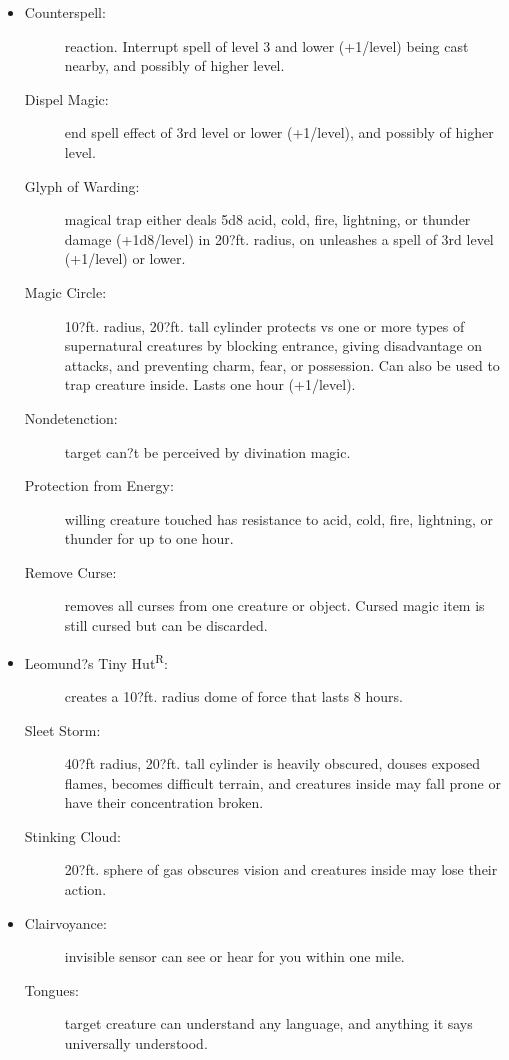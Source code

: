 \documentclass[DIV=14, paper=a4, fontsize=10pt, twocolumn, twoside]{scrartcl}
\begin{document}
\begin{itemize}[align=parleft,labelwidth=1cm]
	\renewcommand{\labelitemi}{Abjur}\item
	\begin{description}
 \item[Counterspell:] reaction. Interrupt spell of level 3 and lower (+1/level) being cast nearby, and possibly of higher level.
 \item[Dispel Magic:] end spell effect of 3rd level or lower (+1/level), and possibly of higher level.
 \item[Glyph of Warding:] magical trap either deals 5d8 acid, cold, fire, lightning, or thunder damage (+1d8/level) in 20?ft. radius, on unleashes a spell of 3rd level (+1/level) or lower.
 \item[Magic Circle:] 10?ft. radius, 20?ft. tall cylinder protects vs one or more types of supernatural creatures by blocking entrance, giving disadvantage on attacks, and preventing charm, fear, or possession. Can also be used to trap creature inside. Lasts one hour (+1/level).
 \item[Nondetenction:] target can?t be perceived by divination magic.
 \item[Protection from Energy:] willing creature touched has resistance to acid, cold, fire, lightning, or thunder for up to one hour.
 \item[Remove Curse:] removes all curses from one creature or object. Cursed magic item is still cursed but can be discarded.
\end{description}
\renewcommand{\labelitemi}{Conj}\item
\begin{description}
 \item[Leomund?s Tiny Hut\textsuperscript{R}:] creates a 10?ft. radius dome of force that lasts 8 hours.
 \item[Sleet Storm:] 40?ft radius, 20?ft. tall cylinder is heavily obscured, douses exposed flames, becomes difficult terrain, and creatures inside may fall prone or have their concentration broken.
 \item[Stinking Cloud:] 20?ft. sphere of gas obscures vision and creatures inside may lose their action.
\end{description}
\renewcommand{\labelitemi}{Div}\item
\begin{description}
 \item[Clairvoyance:] invisible sensor can see or hear for you within one mile.
 \item[Tongues:] target creature can understand any language, and anything it says universally understood.

\end{description}
\end{itemize}
\end{document}
